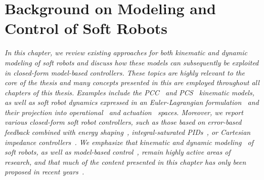 \chapter{Background on Modeling and Control of Soft Robots}\label{chp:background}

\textit{
In this chapter, we review existing approaches for both kinematic and dynamic modeling of soft robots and discuss how these models can subsequently be exploited in closed-form model-based controllers.
These topics are highly relevant to the core of the thesis and many concepts presented in this are employed throughout all chapters of this thesis.
% 
Examples include the \gls{PCC}~\citep{webster2010design, della2020improved} and \gls{PCS}~\citep{renda2018discrete} kinematic models, as well as soft robot dynamics expressed in an Euler-Lagrangian formulation~\citep{della2023model} and their projection into operational~\citep{khatib1987unified, della2020model} and actuation~\citep{pustina2024input} spaces. Moreover, we report various closed-form soft robot controllers, such as those based on error-based feedback combined with energy shaping~\citep{della2023model}, integral-saturated PIDs~\citep{pustina2022p}, or Cartesian impedance controllers~\citep{della2020model}.
%
We emphasize that kinematic and dynamic modeling~\citep{armanini2023soft} of soft robots, as well as model-based control~\citep{della2023model}, remain highly active areas of research, and that much of the content presented in this chapter has only been proposed in recent years~\citep{yasa2023overview}.
}

\newpage



